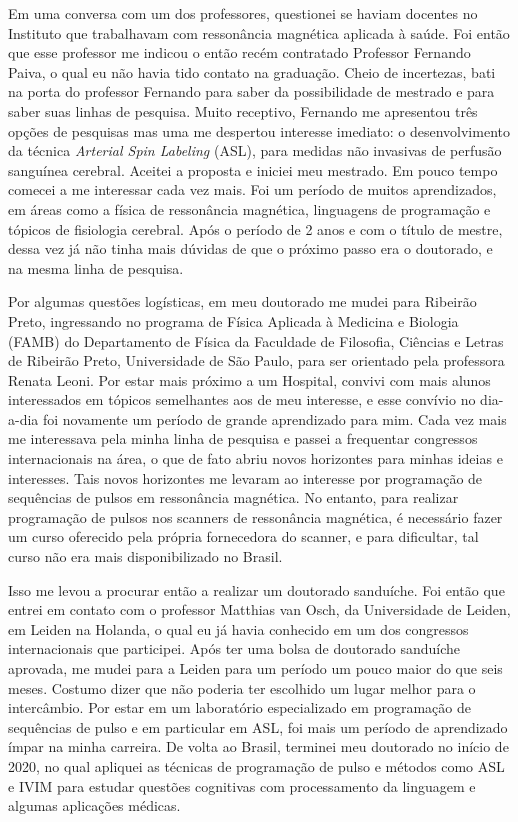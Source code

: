 \documentclass[a4paper,oneside,10pt]{article}
\begin{document}
\begin{onehalfspace}
Em uma conversa com um dos professores, questionei se haviam docentes no Instituto que trabalhavam com ressonância magnética aplicada à saúde. Foi então que 
esse professor me indicou o então recém contratado Professor Fernando Paiva, o qual eu não havia tido contato na graduação. Cheio de incertezas, bati na porta 
do professor Fernando para saber da possibilidade de mestrado e para saber suas linhas de pesquisa. Muito receptivo, Fernando me apresentou três opções de pesquisas 
mas uma me despertou interesse imediato: o desenvolvimento da técnica \textit{Arterial Spin Labeling} (ASL), para medidas não invasivas de perfusão sanguínea 
cerebral. Aceitei a proposta e iniciei meu mestrado. Em pouco tempo comecei a me interessar cada vez mais. Foi um período de muitos aprendizados, em áreas como 
a física de ressonância magnética, linguagens de programação e tópicos de fisiologia cerebral. Após o período de 2 anos e com o título de mestre, dessa vez já não 
tinha mais dúvidas de que o próximo passo era o doutorado, e na mesma linha de pesquisa. 

Por algumas questões logísticas, em meu doutorado me mudei para Ribeirão Preto, ingressando no programa de Física Aplicada à Medicina e Biologia (FAMB) do 
Departamento de Física da Faculdade de Filosofia, Ciências e Letras de Ribeirão Preto, Universidade de São Paulo, para ser orientado pela professora 
Renata Leoni. Por estar mais próximo a um Hospital, convivi com mais alunos interessados em tópicos semelhantes aos de meu interesse, e esse convívio no dia-a-dia 
foi novamente um período de grande aprendizado para mim. Cada vez mais me interessava pela minha linha de pesquisa e passei a frequentar congressos internacionais 
na área, o que de fato abriu novos horizontes para minhas ideias e interesses. Tais novos horizontes me levaram ao interesse por programação de sequências de pulsos 
em ressonância magnética. No entanto, para realizar programação de pulsos nos scanners de ressonância magnética, é necessário fazer um curso oferecido pela 
própria fornecedora do scanner, e para dificultar, tal curso não era mais disponibilizado no Brasil.

Isso me levou a procurar então a realizar um doutorado sanduíche. Foi então que entrei em contato com o professor Matthias van Osch, da Universidade de Leiden, 
em Leiden na Holanda, o qual eu já havia conhecido em um dos congressos internacionais que participei. Após ter uma bolsa de doutorado sanduíche aprovada, 
me mudei para a Leiden para um período um pouco maior do que seis meses. Costumo dizer que não poderia ter escolhido um lugar melhor para o intercâmbio. 
Por estar em um laboratório especializado em programação de sequências de pulso e em particular em ASL, foi mais um período de aprendizado ímpar na minha carreira.
De volta ao Brasil, terminei meu doutorado no início de 2020, no qual apliquei as técnicas de programação de pulso e métodos como ASL e IVIM para estudar 
questões cognitivas com processamento da linguagem e algumas aplicações médicas.


\end{onehalfspace}
\end{document}
